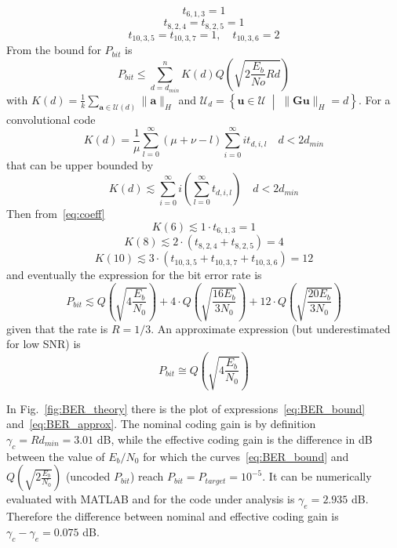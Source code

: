 \documentclass[10pt]{article}
\begin{document}
\begin{equation*}
	t_{6,1,3} = 1
\end{equation*}
\begin{equation}\label{eq:coeff}
	t_{8,2,4} = t_{8,2,5} = 1
\end{equation}
\begin{equation*}
	t_{10, 3, 5} = t_{10, 3, 7} = 1, \quad  t_{10,3,6} = 2
\end{equation*}
From \cite{erseghe} the bound for $P_{bit}$ is
\begin{equation}
	P_{bit} \le \sum_{d=d_{min}}^n K(d)Q\left(\sqrt{2\frac{E_b}{No}Rd}\right)
\end{equation}
with $K(d) = \frac{1}{k} \sum_{\mathbf{a}\in\mathcal{U}(d)} \|\mathbf{a}\|_H$ and $\mathcal{U}_d = \left\{ \mathbf{u} \in \mathcal{U} \; \middle| \; \|\mathbf{Gu} \|_{H} = d \right\}$. For a convolutional code 
\begin{equation}
	K(d) = \frac{1}{\mu}\sum_{l=0}^{\infty} (\mu + \nu - l) \sum_{i=0}^{\infty} i t_{d,i,l} \quad d < 2d_{min}
\end{equation}
that can be upper bounded by
\begin{equation}
	K(d) \lesssim \sum_{i=0}^{\infty} i \left( \sum_{l=0}^{\infty}t_{d,i,l}\right) \quad d < 2d_{min}
\end{equation}
Then from~\eqref{eq:coeff} 
\begin{equation*}
	K(6) \lesssim 1\cdot t_{6,1,3} = 1
\end{equation*}
\begin{equation}
	K(8) \lesssim 2\cdot (t_{8,2,4} + t_{8,2,5}) = 4
\end{equation}
\begin{equation*}
	K(10) \lesssim 3\cdot (t_{10, 3, 5} + t_{10, 3, 7} + t_{10,3,6}) = 12
\end{equation*}
and eventually the expression for the bit error rate is
\begin{equation}\label{eq:BER_bound}
	P_{bit} \lesssim Q\left(\sqrt{4\frac{E_b}{N_0}} \right) + 4\cdot Q\left(\sqrt{\frac{16E_b}{3N_0}} \right) + 12 \cdot Q\left(\sqrt{\frac{20E_b}{3N_0}} \right)
\end{equation}
given that the rate is $R=1/3$. An approximate expression (but underestimated for low SNR) is
\begin{equation}\label{eq:BER_approx}
	P_{bit} \cong Q\left(\sqrt{4\frac{E_b}{N_0}} \right)
\end{equation}

In Fig.~\ref{fig:BER_theory} there is the plot of expressions~\eqref{eq:BER_bound} and~\eqref{eq:BER_approx}. The nominal coding gain is by definition $\gamma_c = Rd_{min} = 3.01$ dB, while the effective coding gain is the difference in dB between the value of $E_b/N_0$ for which the curves~\eqref{eq:BER_bound} and $Q\left(\sqrt{2\frac{E_b}{N_0}}\right)$ (uncoded $P_{bit}$) reach $P_{bit} = P_{target} = 10^{-5}$. It can be numerically evaluated with MATLAB and for the code under analysis is $\gamma_e = 2.935$ dB. Therefore the difference between nominal and effective coding gain is $\gamma_c - \gamma_e = 0.075$ dB.
\end{document}
